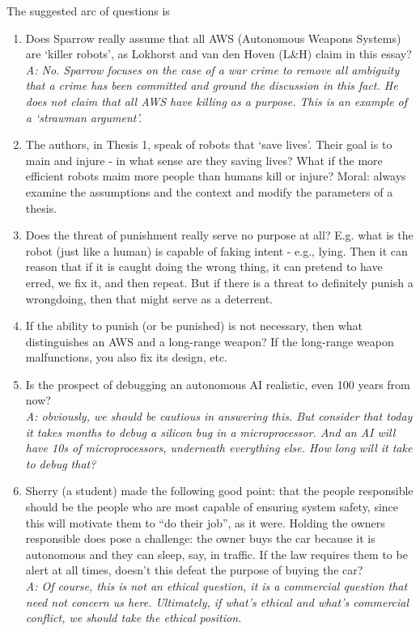 \documentclass[letta4 paper]{article}
\numberwithin{equation}{section}
\newcommand{\0}{\mathbf{0}}
\begin{document}
	The suggested arc of questions is 
	\begin{enumerate}
		\item Does Sparrow really assume that all AWS (Autonomous Weapons Systems) are `killer robots', as Lokhorst and van den Hoven (L\&H) claim in this essay?
		\\
		\textit{A: No. Sparrow focuses on the case of a war crime to remove all ambiguity that a crime has been committed and ground the discussion in this fact. He does not claim that all AWS have killing as a purpose. This is an example of a `strawman argument'.}
		
		\item The authors, in Thesis 1, speak of robots that `save lives'. Their goal is to main and injure - in what sense are they saving lives? What if the more efficient robots maim more people than humans kill or injure?
		Moral: always examine the assumptions and the context and modify the parameters of a thesis.
		
		\item Does the threat of punishment really serve no purpose at all? E.g. what is the robot (just like a human) is capable of faking intent - e.g., lying. Then it can reason that if it is caught doing the wrong thing, it can pretend to have erred, we fix it, and then repeat. But if there is a threat to definitely punish a wrongdoing, then that might serve as a deterrent. 
		
		\item If the ability to punish (or be punished) is not necessary, then what distinguishes an AWS and a long-range weapon? If the long-range weapon malfunctions, you also fix its design, etc.
		
		\item Is the prospect of debugging an autonomous AI realistic, even 100 years from now?
		\\
		\textit{A: obviously, we should be cautious in answering this. But consider that today it takes months to debug a silicon bug in a microprocessor. And an AI will have 10s of microprocessors, underneath everything else. How long will it take to debug that?}
		
		\item Sherry (a student) made the following good point: that the people responsible should be the people who are most capable of ensuring system safety, since this will motivate them to “do their job”, as it were. Holding the owners responsible does pose a challenge: the owner buys the car because it is autonomous and they can sleep, say, in traffic. If the law requires them to be alert at all times, doesn’t this defeat the purpose of buying the car? 
		\\
		\textit{A: Of course, this is not an ethical question, it is a commercial question that need not concern us here. Ultimately, if what’s ethical and what’s commercial conflict, we should take the ethical position.}
		
	\end{enumerate}
	
\end{document}
